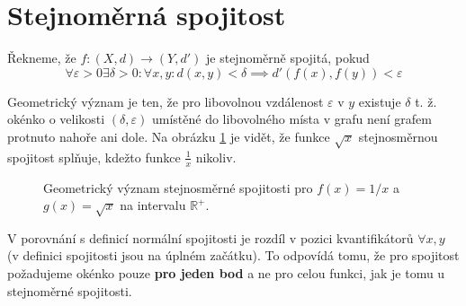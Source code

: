 \documentclass[../main.tex]{subfiles}
\begin{document}
\section{Stejnoměrná spojitost}
\begin{definition}
	Řekneme, že $f : (X,d) \rightarrow (Y,d')$ je stejnoměrně spojitá, pokud
	\[\forall \varepsilon > 0 \exists \delta > 0 : \forall x,y : d(x,y) < \delta \implies d'(f(x),f(y)) < \varepsilon\]
\end{definition}

\begin{intuition}
	Geometrický význam je ten, že pro libovolnou vzdálenost \(\varepsilon\) v \(y\) existuje \(\delta\) t. ž. okénko o velikosti \((\delta, \varepsilon)\) umístěné do libovolného místa v grafu není grafem protnuto nahoře ani dole. Na obrázku \ref{fig:con} je vidět, že funkce \(\sqrt{x}\) stejnosměrnou spojitost splňuje, kdežto funkce \(\frac{1}{x}\) nikoliv.

	\begin{figure}[h]
		\centering
		\hspace{3em}
		\hspace{3em}
		\caption{Geometrický význam stejnosměrné spojitosti pro \(f(x) = 1/x\) a \(g(x) = \sqrt{x}\) na intervalu \(\mathbb{R}^+\).}
		\label{fig:con}
	\end{figure}

	V porovnání s definicí normální spojitosti je rozdíl v pozici kvantifikátorů \(\forall x, y\) (v definici spojitosti jsou na úplném začátku). To odpovídá tomu, že pro spojitost požadujeme okénko pouze \textbf{pro jeden bod} a ne pro celou funkci, jak je tomu u stejnoměrné spojitosti.
\end{intuition}
\end{document}
